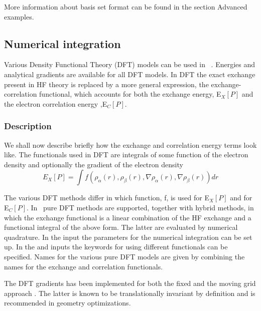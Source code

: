 More information about basis set format can be found in
the section Advanced examples.

\noindent

\subsection{Numerical integration}
\label{UG:sec:dft}

Various Density Functional Theory (DFT) models can be used in \molcas\ .
Energies and analytical gradients are available for all DFT models.
In DFT the exact exchange present in HF theory is replaced by a more general
expression, the exchange-correlation functional, which accounts for both the exchange energy, E$_X [P]$
and the electron correlation energy ,E$_C [P]$.

\subsubsection{Description}
\label{UG:sec:dft_description}
We shall now describe briefly how the exchange and correlation energy terms look like.
The functionals used in DFT are integrals of some function of the electron density and optionally the gradient
of the electron density
\begin{equation}
E_X[P] = \int f(\rho_{\alpha}(r), \rho_{\beta}(r), \nabla \rho_{\alpha}(r), \nabla \rho_{\beta}(r)) dr
\end{equation}

The various DFT methods differ in which function, f, is used for E$_X[P]$ and for E$_C[P]$.
In \molcas\ pure DFT methods are supported, together with hybrid methods, in which the exchange functional
is a linear combination of the HF exchange and a functional integral of the above form.
The latter are evaluated by numerical quadrature.
In the  input the parameters for the numerical integration can be set up.
In the  and  inputs the keywords for
using different functionals can be specified.
Names for the various pure DFT models are given by combining the names for the exchange and correlation functionals.

The DFT gradients has been implemented for both the fixed and the moving grid approach \cite{Johnson:93,Handy:93,Baker:94}.
The latter is known to be translationally invariant by definition and is recommended in geometry optimizations.

%
%


